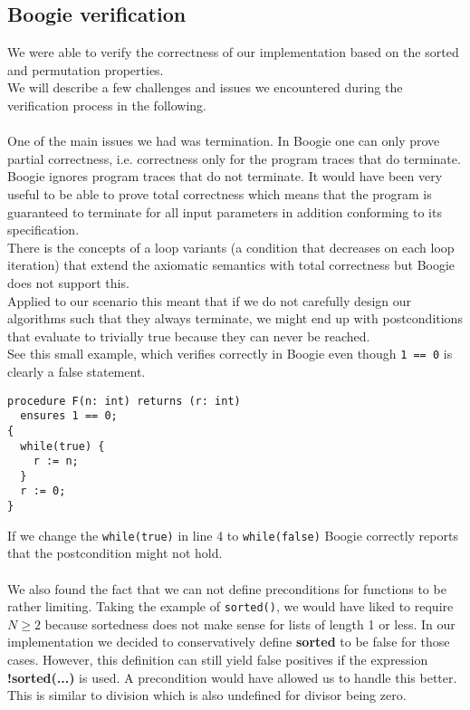 \documentclass{report}
\begin{document}
\subsection{Boogie verification}
\label{s:boogie_verification}
We were able to verify the correctness of our implementation based on the sorted and permutation properties.\\
We will describe a few challenges and issues we encountered during the verification process in the following.
\\\\
One of the main issues we had was termination. In Boogie one can only prove partial correctness, i.e. correctness only for the program traces that do terminate.
Boogie ignores program traces that do not terminate. It would have been very useful to be able to prove total correctness which means that the program is
guaranteed to terminate for all input parameters in addition conforming to its specification.\\
There is the concepts of a loop variants (a condition that decreases on each loop iteration) that extend the axiomatic semantics with total correctness but Boogie does not support this.\\
Applied to our scenario this meant that if we do not carefully design our algorithms such that they always terminate, we might end up with postconditions that evaluate to trivially true because they can never be reached.\\
See this small example, which verifies correctly in Boogie even though \texttt{1 == 0} is clearly a false statement.
\begin{lstlisting}
procedure F(n: int) returns (r: int)
  ensures 1 == 0;
{
  while(true) {
    r := n;
  }
  r := 0;
}
\end{lstlisting}
If we change the \texttt{while(true)} in line 4 to \texttt{while(false)} Boogie correctly reports that the postcondition might not hold.
\\\\
We also found the fact that we can not define preconditions for functions to be rather limiting. Taking the example of \texttt{sorted()}, we would have liked to require $N \geq 2$ because sortedness does not make sense for lists of length 1 or less. In our implementation we decided to conservatively define \textbf{sorted} to be false for those cases. However, this definition can still yield false positives if the expression \textbf{!sorted(...)} is used. A precondition would have allowed us to handle this better. This is similar to division which is also undefined for divisor being zero.
\end{document}
